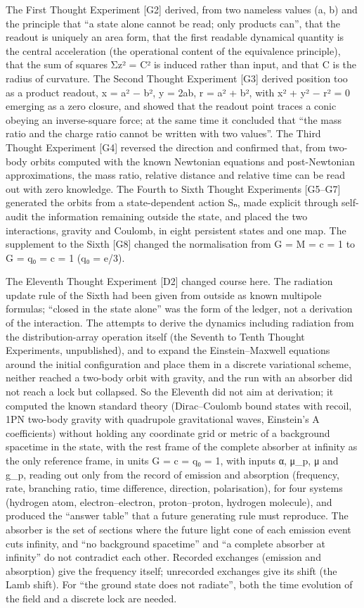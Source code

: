 \documentclass[
  a4paper,
]{article}
\begin{document}
The First Thought Experiment {[}G2{]} derived, from two nameless values
(a, b) and the principle that ``a state alone cannot be read; only
products can'', that the readout is uniquely an area form, that the
first readable dynamical quantity is the central acceleration (the
operational content of the equivalence principle), that the sum of
squares Σz² = C² is induced rather than input, and that C is the radius
of curvature. The Second Thought Experiment {[}G3{]} derived position
too as a product readout, x = a² − b², y = 2ab, r = a² + b², with x² +
y² − r² = 0 emerging as a zero closure, and showed that the readout
point traces a conic obeying an inverse-square force; at the same time
it concluded that ``the mass ratio and the charge ratio cannot be
written with two values''. The Third Thought Experiment {[}G4{]}
reversed the direction and confirmed that, from two-body orbits computed
with the known Newtonian equations and post-Newtonian approximations,
the mass ratio, relative distance and relative time can be read out with
zero knowledge. The Fourth to Sixth Thought Experiments {[}G5--G7{]}
generated the orbits from a state-dependent action Sₙ, made explicit
through self-audit the information remaining outside the state, and
placed the two interactions, gravity and Coulomb, in eight persistent
states and one map. The supplement to the Sixth {[}G8{]} changed the
normalisation from G = M = c = 1 to G = q₀ = c = 1 (q₀ = e/3).

The Eleventh Thought Experiment {[}D2{]} changed course here. The
radiation update rule of the Sixth had been given from outside as known
multipole formulas; ``closed in the state alone'' was the form of the
ledger, not a derivation of the interaction. The attempts to derive the
dynamics including radiation from the distribution-array operation
itself (the Seventh to Tenth Thought Experiments, unpublished), and to
expand the Einstein--Maxwell equations around the initial configuration
and place them in a discrete variational scheme, neither reached a
two-body orbit with gravity, and the run with an absorber did not reach
a lock but collapsed. So the Eleventh did not aim at derivation; it
computed the known standard theory (Dirac--Coulomb bound states with
recoil, 1PN two-body gravity with quadrupole gravitational waves,
Einstein's A coefficients) without holding any coordinate grid or metric
of a background spacetime in the state, with the rest frame of the
complete absorber at infinity as the only reference frame, in units G =
c = q₀ = 1, with inputs α, μ\_p, μ and g\_p, reading out only from the
record of emission and absorption (frequency, rate, branching ratio,
time difference, direction, polarisation), for four systems (hydrogen
atom, electron--electron, proton--proton, hydrogen molecule), and
produced the ``answer table'' that a future generating rule must
reproduce. The absorber is the set of sections where the future light
cone of each emission event cuts infinity, and ``no background
spacetime'' and ``a complete absorber at infinity'' do not contradict
each other. Recorded exchanges (emission and absorption) give the
frequency itself; unrecorded exchanges give its shift (the Lamb shift).
For ``the ground state does not radiate'', both the time evolution of
the field and a discrete lock are needed.
\end{document}
